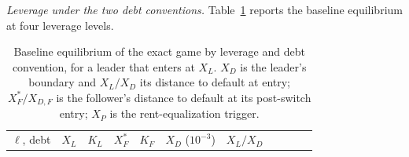\documentclass[
  11pt,
  letterpaper,
]{scrartcl}
\begin{document}
\emph{Leverage under the two debt conventions.}
Table~\ref{tbl-duopoly-leverage} reports the baseline equilibrium at
four leverage levels.

\begingroup\setlength{\tabcolsep}{2pt}

\begin{longtable}[]{@{}
  >{\raggedright\arraybackslash}p{}
  >{\raggedleft\arraybackslash}p{}
  >{\raggedleft\arraybackslash}p{}
  >{\raggedleft\arraybackslash}p{}
  >{\raggedleft\arraybackslash}p{}
  >{\raggedleft\arraybackslash}p{}
  >{\raggedleft\arraybackslash}p{}
  >{\raggedleft\arraybackslash}p{}
  >{\raggedleft\arraybackslash}p{}
  >{\raggedleft\arraybackslash}p{}
  >{\raggedleft\arraybackslash}p{}@{}}
\caption{Baseline equilibrium of the exact game by leverage and debt
convention, for a leader that enters at \(X_L\). \(X_{D}\) is the
leader's boundary and \(X_L/X_D\) its distance to default at entry;
\(X_F^*/X_{D,F}\) is the follower's distance to default at its
post-switch entry; \(X_P\) is the rent-equalization
trigger.}\label{tbl-duopoly-leverage}\tabularnewline
\toprule\noalign{}
\begin{minipage}[b]{\linewidth}\raggedright
\(\ell\), debt
\end{minipage} & \begin{minipage}[b]{\linewidth}\raggedleft
\(X_L\)
\end{minipage} & \begin{minipage}[b]{\linewidth}\raggedleft
\(K_L\)
\end{minipage} & \begin{minipage}[b]{\linewidth}\raggedleft
\(X_F^*\)
\end{minipage} & \begin{minipage}[b]{\linewidth}\raggedleft
\(K_F\)
\end{minipage} & \begin{minipage}[b]{\linewidth}\raggedleft
\(X_D\) (\(10^{-3}\))
\end{minipage} & \begin{minipage}[b]{\linewidth}\raggedleft
\(X_L/X_D\)
\end{minipage} & \begin{minipage}[b]{\linewidth}\raggedleft

\end{minipage}
\end{longtable}
\end{document}
